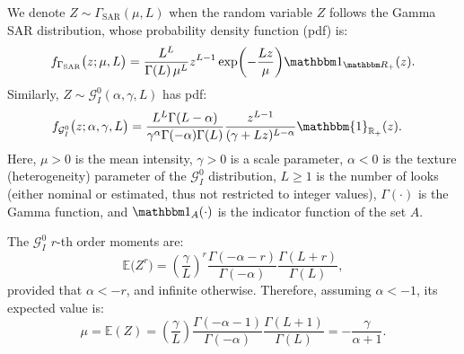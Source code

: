 \documentclass[
  lettersize  journal,
]{IEEEtran}%
\begin{document}
We denote \(Z \sim \Gamma_{\mathrm{SAR}}(\mu,L)\) when the random
variable \(Z\) follows the Gamma SAR distribution, whose probability
density function (pdf) is: \begin{equation}
f_{\Gamma_{\mathrm{SAR}}}\bigl(z;\mu, L\bigr) 
= \frac{L^L}{\Gamma(L)\,\mu^L} z^{L-1} 
\exp \biggl(-\frac{Lz}{\mu}\biggr)
\mathbbm 1_{\mathbbm R_+}(z). \label{E:gamma1}
\end{equation} Similarly, \(Z \sim \mathcal{G}^0_I(\alpha,\gamma,L)\)
has pdf: \begin{align}
f_{\mathcal{G}^0_I}\bigl(z;  \alpha,\gamma, L \bigr) &=\frac{L^L\Gamma(L-\alpha)}{\gamma^{\alpha}\Gamma(-\alpha)\Gamma(L)}\frac{z^{L-1}}{(\gamma+Lz)^{L-\alpha}} \mathbbm{1}_{\mathbb{R}_+}(z). \label{E:gi01}
\end{align} Here, \(\mu > 0\) is the mean intensity, \(\gamma > 0\) is a
scale parameter, \(\alpha < 0\) is the texture (heterogeneity) parameter
of the \(\mathcal{G}^0_I\) distribution, \(L \geq 1\) is the number of
looks (either nominal or estimated, thus not restricted to integer
values), \(\Gamma(\cdot)\) is the Gamma function, and
\(\mathbbm 1_{A}(\cdot)\) is the indicator function of the set \(A\).

The \(\mathcal{G}_I^0\) \(r\)-th order moments are: \begin{equation}
\mathbb{E}\big(Z^r\big) = \left(\frac{\gamma}{L}\right)^r\frac{\Gamma(-\alpha-r)}{\Gamma(-\alpha)}\frac{\Gamma(L+r)}{\Gamma(L)}, 
\label{E:rmom}
\end{equation} provided that \(\alpha <-r\), and infinite otherwise.
Therefore, assuming \(\alpha<-1\), its expected value is:
\begin{equation}
\mu=\mathbb{E}(Z)=\left(\frac{\gamma}{L}\right)\frac{\Gamma(-\alpha-1)}{\Gamma(-\alpha)}\frac{\Gamma(L+1)}{\Gamma(L)}=-\frac{\gamma}{\alpha+1}.
\label{E:mean1}
\end{equation}
\end{document}
